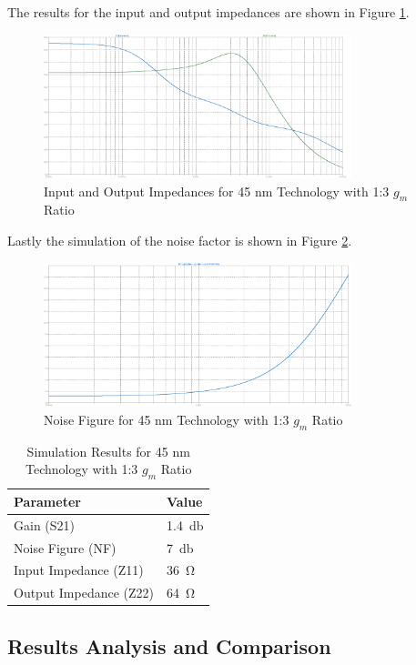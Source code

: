 The results for the input and output impedances are shown in Figure \ref{fig:ZParam45nm1to3}.

\begin{figure}[H]
    \centering
    \includegraphics[width=0.8\textwidth]{Images/Imp_45_1To3.png}
    \caption{Input and Output Impedances for 45 nm Technology with 1:3 $g_m$ Ratio}
    \label{fig:ZParam45nm1to3}
\end{figure}

Lastly the simulation of the noise factor is shown in Figure \ref{fig:Noise45nm1to3}.
\begin{figure}[H]
    \centering
    \includegraphics[width=0.8\textwidth]{Images/Noise_45_1To3.png}
    \caption{Noise Figure for 45 nm Technology with 1:3 $g_m$ Ratio}
    \label{fig:Noise45nm1to3}
\end{figure}

\begin{table}[H]
    \centering
    \caption{Simulation Results for 45 nm Technology with 1:3 $g_m$ Ratio}
    \begin{tabularx}{\textwidth}{>{\centering\arraybackslash}X >{\centering\arraybackslash}X }
        \toprule
        \textbf{Parameter} & \textbf{Value}\\
        \midrule
        Gain (S21) & \SI{1.4}{\decibel} \\
        \midrule
        Noise Figure (NF) & \SI{7}{\decibel} \\
        \midrule
        Input Impedance (Z11) & \SI{36}{\ohm} \\
        \midrule
        Output Impedance (Z22) & \SI{64}{\ohm} \\
        \bottomrule
    \end{tabularx}
    \label{tab:45nm_1ton_results}
\end{table}


\subsection{Results Analysis and Comparison}